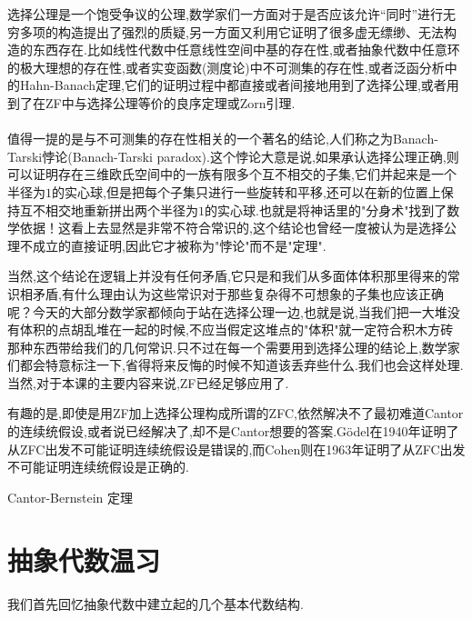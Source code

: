 选择公理是一个饱受争议的公理,数学家们一方面对于是否应该允许“同时”进行无穷多项的构造提出了强烈的质疑,另一方面又利用它证明了很多虚无缥缈、无法构造的东西存在.比如线性代数中任意线性空间中基的存在性,或者抽象代数中任意环的极大理想的存在性,或者实变函数(测度论)中不可测集的存在性,或者泛函分析中的Hahn-Banach定理,它们的证明过程中都直接或者间接地用到了选择公理,或者用到了在ZF中与选择公理等价的良序定理或Zorn引理.
\\ \hspace*{\fill} \\%
值得一提的是与不可测集的存在性相关的一个著名的结论,人们称之为Banach-Tarski悖论(Banach-Tarski paradox).这个悖论大意是说,如果承认选择公理正确,则可以证明存在三维欧氏空间中的一族有限多个互不相交的子集,它们并起来是一个半径为$1$的实心球,但是把每个子集只进行一些旋转和平移,还可以在新的位置上保持互不相交地重新拼出两个半径为$1$的实心球.也就是将神话里的"分身术"找到了数学依据！这看上去显然是非常不符合常识的,这个结论也曾经一度被认为是选择公理不成立的直接证明,因此它才被称为"悖论"而不是"定理".




当然,这个结论在逻辑上并没有任何矛盾,它只是和我们从多面体体积那里得来的常识相矛盾,有什么理由认为这些常识对于那些复杂得不可想象的子集也应该正确呢？今天的大部分数学家都倾向于站在选择公理一边,也就是说,当我们把一大堆没有体积的点胡乱堆在一起的时候,不应当假定这堆点的"体积"就一定符合积木方砖那种东西带给我们的几何常识.只不过在每一个需要用到选择公理的结论上,数学家们都会特意标注一下,省得将来反悔的时候不知道该丢弃些什么.我们也会这样处理.当然,对于本课的主要内容来说,ZF已经足够应用了.




有趣的是,即使是用ZF加上选择公理构成所谓的ZFC,依然解决不了最初难道Cantor的连续统假设,或者说已经解决了,却不是Cantor想要的答案.Gödel在1940年证明了从ZFC出发不可能证明连续统假设是错误的,而Cohen则在1963年证明了从ZFC出发不可能证明连续统假设是正确的.


{Cantor-Bernstein 定理}




\section{抽象代数温习}
我们首先回忆抽象代数中建立起的几个基本代数结构.

